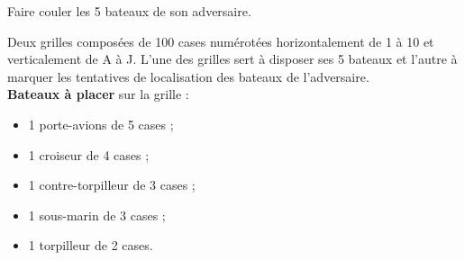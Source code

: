 \begin{enigme}    
   \begin{minipage}{0.4\linewidth}  
       Faire couler les 5 bateaux de son adversaire.

      \partie[matériel.] Deux grilles composées de 100 cases numérotées horizontalement de 1 à 10 et verticalement de A à J. L'une des grilles sert à disposer ses 5 bateaux et l’autre à marquer les tentatives de localisation des bateaux de l’adversaire. \\  
      {\bf Bateaux à placer} sur la grille :
      \begin{itemize}
         \item 1 porte-avions de 5 cases ;
         \item 1 croiseur de 4 cases ;
         \item 1 contre-torpilleur de 3 cases ;
         \item 1 sous-marin de 3 cases ;
         \item 1 torpilleur de 2 cases.
      \end{itemize}
   

\end{minipage}
\end{enigme}
